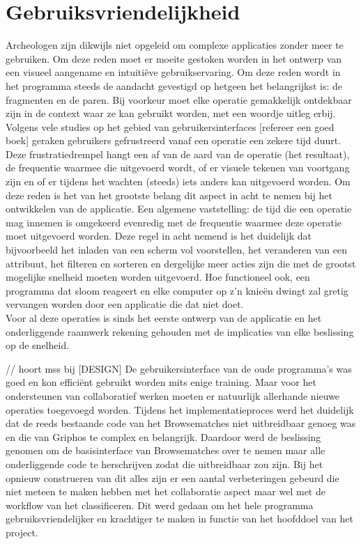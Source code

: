 \section{Gebruiksvriendelijkheid}
Archeologen zijn dikwijls niet opgeleid om complexe applicaties zonder meer te gebruiken. Om deze reden moet er moeite gestoken worden in het ontwerp van een visueel aangename en intuiti\"eve gebruikservaring. Om deze reden wordt in het programma steeds de aandacht gevestigd op hetgeen het belangrijkst is: de fragmenten en de paren. Bij voorkeur moet elke operatie gemakkelijk ontdekbaar zijn in de context waar ze kan gebruikt worden, met een woordje uitleg erbij.\\

Volgens vele studies op het gebied van gebruikersinterfaces [refereer een goed boek] geraken gebruikers gefrustreerd vanaf een operatie een zekere tijd duurt. Deze frustratiedrempel hangt een af van de aard van de operatie (het resultaat), de frequentie waarmee die uitgevoerd wordt, of er visuele tekenen van voortgang zijn en of er tijdens het wachten (steeds) iets anders kan uitgevoerd worden. Om deze reden is het van het grootste belang dit aspect in acht te nemen bij het ontwikkelen van de applicatie. Een algemene vaststelling: de tijd die een operatie mag innemen is omgekeerd evenredig met de frequentie waarmee deze operatie moet uitgevoerd worden. Deze regel in acht nemend is het duidelijk dat bijvoorbeeld het inladen van een scherm vol voorstellen, het veranderen van een attribuut, het filteren en sorteren en dergelijke meer acties zijn die met de grootst mogelijke snelheid moeten worden uitgevoerd. Hoe functioneel ook, een programma dat sloom reageert en elke computer op z'n knie\"en dwingt zal gretig vervangen worden door een applicatie die dat niet doet.\\

Voor al deze operaties is sinds het eerste ontwerp van de applicatie en het onderliggende raamwerk rekening gehouden met de implicaties van elke beslissing op de snelheid.

// hoort mss bij [DESIGN]
De gebruikersinterface van de oude programma's was goed en kon effici\"ent gebruikt worden mits enige training. Maar voor het ondersteunen van collaboratief werken moeten er natuurlijk allerhande nieuwe operaties toegevoegd
worden. Tijdens het implementatieproces werd het duidelijk dat de reeds bestaande code van het Browsematches niet uitbreidbaar genoeg was en die van Griphos te complex en belangrijk. Daardoor werd de beslissing genomen om de
basisinterface van Browsematches over te nemen maar alle onderliggende code te herschrijven zodat die uitbreidbaar zou zijn. Bij het opnieuw construeren van dit alles zijn er een aantal verbeteringen gebeurd die niet meteen te maken hebben met het collaboratie aspect maar wel met de workflow van het classificeren. Dit werd gedaan om het hele programma gebruiksvriendelijker en krachtiger te maken in functie van het hoofddoel van het project.

